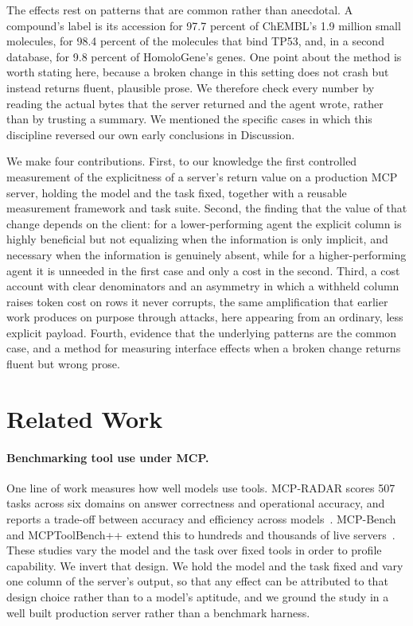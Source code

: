 \documentclass[sigconf]{ceurart}
\begin{document}
The effects rest on patterns that are common rather than anecdotal. A compound's
label is its accession for 97.7 percent of ChEMBL's 1.9 million small molecules,
for 98.4 percent of the molecules that bind TP53, and, in a second database, for
9.8 percent of HomoloGene's genes. One point about the method is worth stating
here, because a broken change in this setting does not crash but instead returns
fluent, plausible prose. We therefore check every number by reading the actual
bytes that the server returned and the agent wrote, rather than by trusting a
summary. We mentioned the specific cases in which this
discipline reversed our own early conclusions in Discussion.

We make four contributions. First, to our knowledge the first controlled
measurement of the explicitness of a server's return value on a production MCP
server, holding the model and the task fixed, together with a reusable measurement
framework and task suite. Second, the finding that the value of that change
depends on the client: for a lower-performing agent the explicit column is highly
beneficial but not equalizing when the information is only implicit, and necessary
when the information is genuinely absent, while for a higher-performing agent it is
unneeded in the first case and only a cost in the second. Third, a cost account
with clear denominators and an asymmetry in which a withheld column raises token
cost on rows it never corrupts, the same amplification that earlier work produces
on purpose through attacks, here appearing from an ordinary, less explicit payload.
Fourth, evidence that the underlying patterns are the common case, and a method for
measuring interface effects when a broken change returns fluent but wrong prose.

\section{Related Work}

\paragraph{Benchmarking tool use under MCP.}
One line of work measures how well models use tools. MCP-RADAR scores 507 tasks
across six domains on answer correctness and operational accuracy, and reports a
trade-off between accuracy and efficiency across models~\cite{gao2025mcpradar}.
MCP-Bench and MCPToolBench++ extend this to hundreds and thousands of live
servers~\cite{wang2025mcpbenchbenchmarkingtoolusingllm,fan2025mcptoolbenchlargescaleai}. These studies vary the model
and the task over fixed tools in order to profile capability. We invert that
design. We hold the model and the task fixed and vary one column of the server's
output, so that any effect can be attributed to that design choice rather than to a
model's aptitude, and we ground the study in a well built production server rather
than a benchmark harness.
\end{document}
